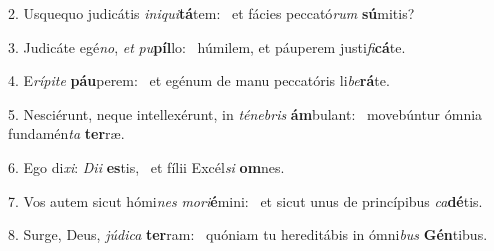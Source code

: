 2. Usquequo judicátis \textit{in}\textit{i}\textit{qui}\textbf{tá}tem: \ast\  et fácies peccató\textit{rum} \textbf{sú}mitis?\

3. Judicáte egé\textit{no}, \textit{et} \textit{pu}\textbf{píl}lo: \ast\  húmilem, et páuperem justi\textit{fi}\textbf{cá}te.\

4. E\textit{rí}\textit{pi}\textit{te} \textbf{páu}perem: \ast\  et egénum de manu peccatóris li\textit{be}\textbf{rá}te.\

5. Nesciérunt, neque intellexérunt, in \textit{té}\textit{ne}\textit{bris} \textbf{ám}bulant: \ast\  movebúntur ómnia fundamén\textit{ta} \textbf{ter}ræ.\

6. Ego di\textit{xi}: \textit{Di}\textit{i} \textbf{es}tis, \ast\  et fílii Excél\textit{si} \textbf{om}nes.\

7. Vos autem sicut hómi\textit{nes} \textit{mo}\textit{ri}\textbf{é}mini: \ast\  et sicut unus de princípibus \textit{ca}\textbf{dé}tis.\

8. Surge, Deus, \textit{jú}\textit{di}\textit{ca} \textbf{ter}ram: \ast\  quóniam tu hereditábis in ómni\textit{bus} \textbf{Gén}tibus.\

